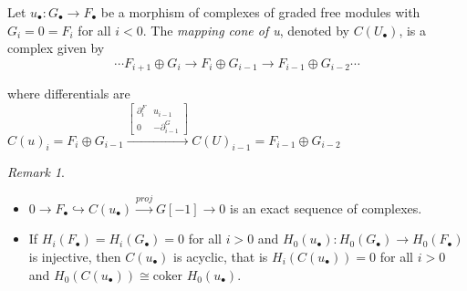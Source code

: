 \documentclass[11pt,letterpaper]{amsart}
\newcommand{\x}{\xrightarrow{}}
\theoremstyle{plain}
\theoremstyle{definition}
\theoremstyle{remark}
\newtheorem{remark}[thm]{Remark}
\begin{document}
 Let $u_\bullet:G_\bullet\x F_\bullet$ be a morphism of complexes of graded free modules with $G_i=0=F_i$ for all $i<0$. 
The \emph{mapping cone of u}, denoted by $C(U_\bullet)$, is a complex given by $$ \cdots F_{i+1}\oplus G_{i}\xrightarrow{}F_{i}\oplus G_{i-1}\xrightarrow{}F_{i-1}\oplus G_{i-2}\cdots$$

where differentials are $C(u)_{i}=F_i\oplus G_{i-1}\xrightarrow{\begin{bmatrix}
    \partial_i^F & u_{i-1}\\
    0    & -\partial_{i-1}^G
\end{bmatrix}}C(U)_{i-1}=F_{i-1}\oplus G_{i-2}$

\begin{remark}\label{mappingcone}
    \begin{itemize}
         \item[(a)] $0\x F_\bullet\hookrightarrow{}C(u_\bullet)\xrightarrow{proj}G[-1]\x 0$ is an exact sequence of complexes.
        \item[(b)] If $H_i(F_\bullet) = H_i(G_\bullet) = 0$ for all $i > 0$ and $H_0(u_\bullet) : H_0(G_\bullet) \rightarrow H_0(F_\bullet)$ is injective, then $C(u_\bullet)$ is acyclic, that is $H_i(C(u_\bullet)) = 0$ for all $i > 0$ and $H_0(C(u_\bullet)) \cong \text{coker } H_0(u_\bullet)$.
        
    \end{itemize}
\end{remark}
\end{document}
